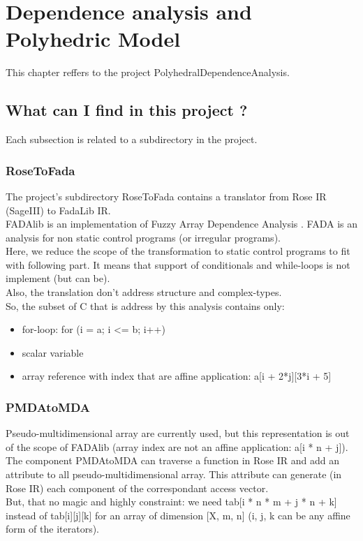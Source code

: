 \chapter{Dependence analysis and Polyhedric Model}

\label{polyhedric:polyhedric}

	This chapter reffers to the project PolyhedralDependenceAnalysis.

	\section{What can I find in this project ?}
	
	Each subsection is related to a subdirectory in the project.
	
		\subsection{RoseToFada}
	
	The project's subdirectory RoseToFada contains a translator from Rose IR (SageIII) to FadaLib IR.\\
	FADAlib \cite{FADAweb} is an implementation of Fuzzy Array Dependence Analysis \cite{FADA}. FADA is an 
analysis for non static control programs (or irregular programs).\\
	Here, we reduce the scope of the transformation to static control programs \cite{Feautrier} to fit with 
following part. It means that support of conditionals and while-loops is not implement (but can be).\\
	Also, the translation don't address structure and complex-types.\\
	
	So, the subset of C that is address by this analysis contains only:
\begin{itemize}
	\item for-loop: for (i = a; i <= b; i++)
	\item scalar variable
	\item array reference with index that are affine application: a[i + 2*j][3*i + 5]
\end{itemize}
	
		\subsection{PMDAtoMDA}
	
	Pseudo-multidimensional array are currently used, but this representation is out of the scope of FADAlib
(array index are not an affine application: a[i * n + j]).\\
	The component PMDAtoMDA can traverse a function in Rose IR and add an attribute to all pseudo-multidimensional
array. This attribute can generate (in Rose IR) each component of the correspondant access vector.\\
	But, that no magic and highly constraint: we need tab[i * n * m + j * n + k] instead of tab[i][j][k] for an
array of dimension [X, m, n] (i, j, k can be any affine form of the iterators).
	
